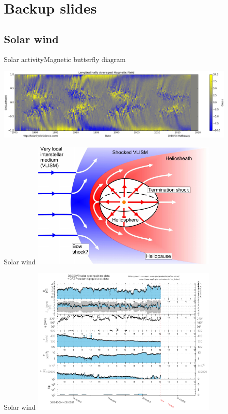 \appendix


\section{Backup slides}

\subsection{Solar wind}

\begin{frame}[c,label=butterfly]{Solar activity}{Magnetic butterfly diagram}
	
	\centering
	\includegraphics[width=0.9\textwidth]{../figures_of_others/images/Hathaway_magbfly_201804_cropped.png}
\end{frame}
\begin{frame}[plain,c]{Solar wind}{}
	\includegraphics[width=0.7\textwidth]{../figures_of_others/images/Owens2013_Heliosphere_screenshot.png}
\end{frame}
\begin{frame}[plain,c]{Solar wind}{}
	\includegraphics[width=0.7\textwidth]{../talk_figures/ace_realtime_ap_plot.png}
\end{frame}

